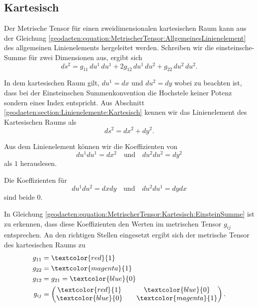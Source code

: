 %
%
%
%
\subsection{Kartesisch\label{geodaeten:section:MetrischerTensor:Kartesisch}}

Der Metrische Tensor für einen zweidimensionalen kartesischen Raum kann aus der Gleichung \eqref{geodaeten:equation:MetrischerTensor:AllgemeinesLinienelement} des allgemeinen Linienelements hergeleitet werden.
Schreiben wir die einsteinsche-Summe für zwei Dimensionen aus, ergibt sich
\begin{equation}
	ds^2 = g_{11} \, du^1 \, du^1 + 2g_{12} \, du^1 \, du^2 + g_{22} \, du^2 \, du^2.
	\label{geodaeten:equation:MetrischerTensor:Kartesisch:EinsteinSumme}
\end{equation}

In dem kartesischen Raum gilt, $du^1 = dx$ und $du^2 = dy$ wobei zu beachten ist, dass bei der Einsteinschen Summenkonvention die Hochstele keiner Potenz sondern eines Index entspricht.
Aus Abschnitt \ref{geodaeten:section:Linienelemente:Kartesisch} kennen wir das Linienelement des Kartesischen Raums als
\begin{equation}
	ds^2 = dx^2 + dy^2 .
\end{equation}

Aus dem Linienelement können wir die Koeffizienten von 
\begin{equation}
	du^1 du^1 = dx^2 \quad \text{und} \quad du^2  du^2 = dy^2 
\end{equation}
als $1$ herauslesen.

Die Koeffizienten für
\begin{equation}
du^1  du^2 = dx  dy \quad \text{und} \quad du^2  du^1 = dy  dx
\end{equation}
sind beide $0$.

In Gleichung \eqref{geodaeten:equation:MetrischerTensor:Kartesisch:EinsteinSumme} ist zu erkennen, dass diese Koeffizienten den Werten im metrischen Tensor $g_{ij}$ entsprechen.
An den richtigen Stellen eingesetzt ergibt sich der metrische Tensor des kartesischen Raums zu
\begin{equation}
	\begin{aligned}
		g_{11} &= \textcolor{red}{1} \\
		g_{22} &= \textcolor{magenta}{1} \\
		g_{12} &= g_{21} = \textcolor{blue}{0} \\
		g_{ij} &= \begin{pmatrix} \textcolor{red}{1} && \textcolor{blue}{0} \\ \textcolor{blue}{0} && \textcolor{magenta}{1} \end{pmatrix} .
	\end{aligned}
\end{equation}
